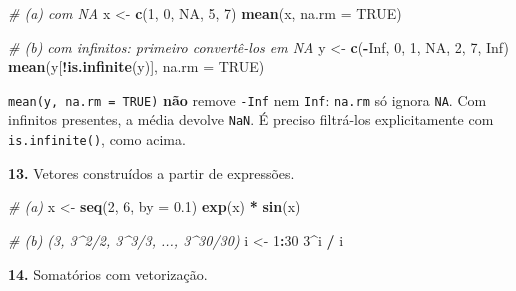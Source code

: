 \documentclass[
  portuguese,
  11pt,
  openany]{book}
\newenvironment{Shaded}{\begin{snugshade}}{\end{snugshade}}
\newcommand{\AttributeTok}[1]{\textcolor[rgb]{0.13,0.29,0.53}{#1}}
\newcommand{\CommentTok}[1]{\textcolor[rgb]{0.56,0.35,0.01}{\textit{#1}}}
\newcommand{\ConstantTok}[1]{\textcolor[rgb]{0.56,0.35,0.01}{#1}}
\newcommand{\DecValTok}[1]{\textcolor[rgb]{0.00,0.00,0.81}{#1}}
\newcommand{\FloatTok}[1]{\textcolor[rgb]{0.00,0.00,0.81}{#1}}
\newcommand{\FunctionTok}[1]{\textcolor[rgb]{0.13,0.29,0.53}{\textbf{#1}}}
\newcommand{\NormalTok}[1]{#1}
\newcommand{\OtherTok}[1]{\textcolor[rgb]{0.56,0.35,0.01}{#1}}
\newcommand{\SpecialCharTok}[1]{\textcolor[rgb]{0.81,0.36,0.00}{\textbf{#1}}}
\begin{document}
\begin{Shaded}
\begin{Highlighting}[]
\CommentTok{\# (a) com NA}
\NormalTok{x }\OtherTok{\textless{}{-}} \FunctionTok{c}\NormalTok{(}\DecValTok{1}\NormalTok{, }\DecValTok{0}\NormalTok{, }\ConstantTok{NA}\NormalTok{, }\DecValTok{5}\NormalTok{, }\DecValTok{7}\NormalTok{)}
\FunctionTok{mean}\NormalTok{(x, }\AttributeTok{na.rm =} \ConstantTok{TRUE}\NormalTok{)}

\CommentTok{\# (b) com infinitos: primeiro convertê{-}los em NA}
\NormalTok{y }\OtherTok{\textless{}{-}} \FunctionTok{c}\NormalTok{(}\SpecialCharTok{{-}}\ConstantTok{Inf}\NormalTok{, }\DecValTok{0}\NormalTok{, }\DecValTok{1}\NormalTok{, }\ConstantTok{NA}\NormalTok{, }\DecValTok{2}\NormalTok{, }\DecValTok{7}\NormalTok{, }\ConstantTok{Inf}\NormalTok{)}
\FunctionTok{mean}\NormalTok{(y[}\SpecialCharTok{!}\FunctionTok{is.infinite}\NormalTok{(y)], }\AttributeTok{na.rm =} \ConstantTok{TRUE}\NormalTok{)}
\end{Highlighting}
\end{Shaded}

\texttt{mean(y,\ na.rm\ =\ TRUE)} \textbf{não} remove \texttt{-Inf} nem \texttt{Inf}: \texttt{na.rm} só ignora \texttt{NA}.
Com infinitos presentes, a média devolve \texttt{NaN}. É preciso filtrá-los
explicitamente com \texttt{is.infinite()}, como acima.

\textbf{13.} Vetores construídos a partir de expressões.

\begin{Shaded}
\begin{Highlighting}[]
\CommentTok{\# (a)}
\NormalTok{x }\OtherTok{\textless{}{-}} \FunctionTok{seq}\NormalTok{(}\DecValTok{2}\NormalTok{, }\DecValTok{6}\NormalTok{, }\AttributeTok{by =} \FloatTok{0.1}\NormalTok{)}
\FunctionTok{exp}\NormalTok{(x) }\SpecialCharTok{*} \FunctionTok{sin}\NormalTok{(x)}

\CommentTok{\# (b) (3, 3\^{}2/2, 3\^{}3/3, ..., 3\^{}30/30)}
\NormalTok{i }\OtherTok{\textless{}{-}} \DecValTok{1}\SpecialCharTok{:}\DecValTok{30}
\DecValTok{3}\SpecialCharTok{\^{}}\NormalTok{i }\SpecialCharTok{/}\NormalTok{ i}
\end{Highlighting}
\end{Shaded}

\textbf{14.} Somatórios com vetorização.
\end{document}
